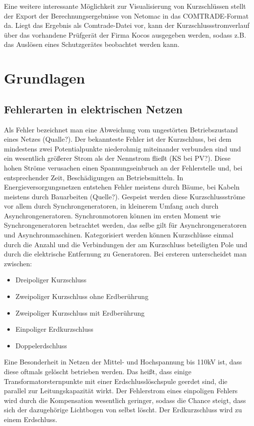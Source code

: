 \documentclass{scrartcl}
\begin{document}
\begin{onehalfspace}
Eine weitere interessante Möglichkeit zur Visualisierung von Kurzschlüssen stellt der Export der Berechnungsergebnisse von Netomac in das COMTRADE-Format da. Liegt das Ergebnis als Comtrade-Datei vor, kann der Kurzschlussstromverlauf über das vorhandene Prüfgerät der Firma Kocos ausgegeben werden, sodass z.B. das Auslösen eines Schutzgerätes beobachtet werden kann.

\section{Grundlagen}


\subsection{Fehlerarten in elektrischen Netzen}
Als Fehler bezeichnet man eine Abweichung vom ungestörten Betriebszustand eines Netzes (Qualle?). Der bekannteste Fehler ist der Kurzschluss, bei dem mindestens zwei Potentialpunkte niederohmig miteinander verbunden sind und ein wesentlich größerer Strom als der Nennstrom fließt (KS bei PV?). Diese hohen Ströme verusachen einen Spannungseinbruch an der Fehlerstelle und, bei entsprechender Zeit, Beschädigungen an Betriebsmitteln. In Energieversorgungsnetzen entstehen Fehler meistens durch Bäume, bei Kabeln meistens durch Bauarbeiten (Quelle?). Gespeist werden diese Kurzschlussströme vor allem durch Synchrongeneratoren, in kleinerem Umfang auch durch Asynchrongeneratoren. Synchronmotoren können im ersten Moment wie Synchrongeneratoren betrachtet werden, das selbe gilt für Asynchrongeneratoren und Asynchronmaschinen. Kategorisiert werden können Kurzschlüsse einmal durch die Anzahl und die Verbindungen der am Kurzschluss beteiligten Pole und durch die elektrische Entfernung zu Generatoren. Bei ersteren unterscheidet man zwischen:

\begin{itemize}
\item Dreipoliger Kurzschluss
\item Zweipoliger Kurzschluss ohne Erdberührung
\item Zweipoliger Kurzschluss mit Erdberührung
\item Einpoliger Erdkurzschluss
\item Doppelerdschluss
\end{itemize}

Eine Besonderheit in Netzen der Mittel- und Hochspannung bis 110kV ist, dass diese oftmals gelöscht betrieben werden. Das heißt, dass einige Transformatorsternpunkte mit einer Erdschlusslöschspule geerdet sind, die parallel zur Leitungskapazität wirkt. Der Fehlerstrom eines einpoligen Fehlers wird durch die Kompensation wesentlich geringer, sodass die Chance steigt, dass sich der dazugehörige Lichtbogen von selbst löscht. Der Erdkurzschluss wird zu einem Erdschluss.


\end{onehalfspace}
\end{document}
